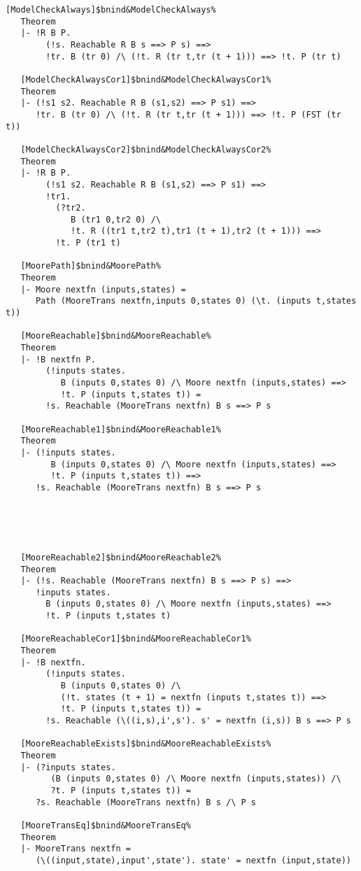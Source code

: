 \documentclass[12pt]{article}
\renewcommand{\t}[1]{\mbox{\tt #1}}
\begin{document}
\begin{footnotesize}
\begin{Verbatim}[commandchars=\$\&\%]
   [ModelCheckAlways]$bnind&ModelCheckAlways%
   Theorem
   |- !R B P.
        (!s. Reachable R B s ==> P s) ==>
        !tr. B (tr 0) /\ (!t. R (tr t,tr (t + 1))) ==> !t. P (tr t)
   
   [ModelCheckAlwaysCor1]$bnind&ModelCheckAlwaysCor1%
   Theorem
   |- (!s1 s2. Reachable R B (s1,s2) ==> P s1) ==>
      !tr. B (tr 0) /\ (!t. R (tr t,tr (t + 1))) ==> !t. P (FST (tr t))
   
   [ModelCheckAlwaysCor2]$bnind&ModelCheckAlwaysCor2%
   Theorem
   |- !R B P.
        (!s1 s2. Reachable R B (s1,s2) ==> P s1) ==>
        !tr1.
          (?tr2.
             B (tr1 0,tr2 0) /\
             !t. R ((tr1 t,tr2 t),tr1 (t + 1),tr2 (t + 1))) ==>
          !t. P (tr1 t)
   
   [MoorePath]$bnind&MoorePath%
   Theorem
   |- Moore nextfn (inputs,states) =
      Path (MooreTrans nextfn,inputs 0,states 0) (\t. (inputs t,states t))
   
   [MooreReachable]$bnind&MooreReachable%
   Theorem
   |- !B nextfn P.
        (!inputs states.
           B (inputs 0,states 0) /\ Moore nextfn (inputs,states) ==>
           !t. P (inputs t,states t)) =
        !s. Reachable (MooreTrans nextfn) B s ==> P s
   
   [MooreReachable1]$bnind&MooreReachable1%
   Theorem
   |- (!inputs states.
         B (inputs 0,states 0) /\ Moore nextfn (inputs,states) ==>
         !t. P (inputs t,states t)) ==>
      !s. Reachable (MooreTrans nextfn) B s ==> P s
   




   [MooreReachable2]$bnind&MooreReachable2%
   Theorem
   |- (!s. Reachable (MooreTrans nextfn) B s ==> P s) ==>
      !inputs states.
        B (inputs 0,states 0) /\ Moore nextfn (inputs,states) ==>
        !t. P (inputs t,states t)
   
   [MooreReachableCor1]$bnind&MooreReachableCor1%
   Theorem
   |- !B nextfn.
        (!inputs states.
           B (inputs 0,states 0) /\
           (!t. states (t + 1) = nextfn (inputs t,states t)) ==>
           !t. P (inputs t,states t)) =
        !s. Reachable (\((i,s),i',s'). s' = nextfn (i,s)) B s ==> P s
   
   [MooreReachableExists]$bnind&MooreReachableExists%
   Theorem
   |- (?inputs states.
         (B (inputs 0,states 0) /\ Moore nextfn (inputs,states)) /\
         ?t. P (inputs t,states t)) =
      ?s. Reachable (MooreTrans nextfn) B s /\ P s
   
   [MooreTransEq]$bnind&MooreTransEq%
   Theorem
   |- MooreTrans nextfn =
      (\((input,state),input',state'). state' = nextfn (input,state))
   

\end{Verbatim}
\end{footnotesize}
\end{document}
